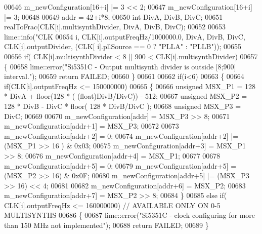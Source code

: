 \begin{DoxyCode}
{00646         m\_newConfiguration[16+i] |= 3 << 2;
00647         m\_newConfiguration[16+i] |= 3;
00648 
00649         addr = 42+i*8;
00650         \textcolor{keywordtype}{int} DivA, DivB, DivC;
00651         realToFrac(CLK[i].multisynthDivider, DivA, DivB, DivC);
00652 
00653         lime::info(\textcolor{stringliteral}{"CLK%
00654             i, CLK[i].outputFreqHz/1000000.0, DivA, DivB, DivC, CLK[i].outputDivider, (CLK[
      i].pllSource == 0 ? \textcolor{stringliteral}{"PLLA"} : \textcolor{stringliteral}{"PLLB"}));
00655 
00656         \textcolor{keywordflow}{if}( CLK[i].multisynthDivider < 8 || 900 < CLK[i].multisynthDivider)
00657         \{
00658             lime::error(\textcolor{stringliteral}{"Si5351C - Output multisynth divider is outside [8;900] interval."});
00659             \textcolor{keywordflow}{return} FAILED;
00660         \}
00661 
00662         \textcolor{keywordflow}{if}(i<6)
00663         \{
00664             \textcolor{keywordflow}{if}(CLK[i].outputFreqHz <= 150000000)
00665             \{
00666                 \textcolor{keywordtype}{unsigned} MSX\_P1 = 128 * DivA + floor(128 * ( (\textcolor{keywordtype}{float})DivB/DivC)) - 512;
00667                 \textcolor{keywordtype}{unsigned} MSX\_P2 = 128 * DivB - DivC * floor( 128 * DivB/DivC );
00668                 \textcolor{keywordtype}{unsigned} MSX\_P3 = DivC;
00669 
00670                 m\_newConfiguration[addr] = MSX\_P3 >> 8;
00671                 m\_newConfiguration[addr+1] = MSX\_P3;
00672 
00673                 m\_newConfiguration[addr+2] = 0;
00674                 m\_newConfiguration[addr+2] |= (MSX\_P1 >> 16 ) & 0x03;
00675                 m\_newConfiguration[addr+3] = MSX\_P1 >> 8;
00676                 m\_newConfiguration[addr+4] = MSX\_P1;
00677 
00678                 m\_newConfiguration[addr+5] = 0;
00679                 m\_newConfiguration[addr+5] = (MSX\_P2 >> 16) & 0x0F;
00680                 m\_newConfiguration[addr+5] |= (MSX\_P3 >> 16) << 4;
00681 
00682                 m\_newConfiguration[addr+6] = MSX\_P2;
00683                 m\_newConfiguration[addr+7] = MSX\_P2 >> 8;
00684             \}
00685             \textcolor{keywordflow}{else} \textcolor{keywordflow}{if}( CLK[i].outputFreqHz <= 160000000) \textcolor{comment}{// AVAILABLE ONLY ON 0-5 MULTISYNTHS}
00686             \{
00687                 lime::error(\textcolor{stringliteral}{"Si5351C - clock configuring for more than 150 MHz not implemented"});
00688                 \textcolor{keywordflow}{return} FAILED;
00689             \}
}}
\end{DoxyCode}
